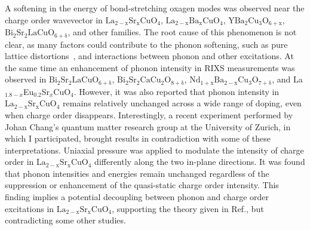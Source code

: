 \documentclass[11pt]{article}
\begin{document}
%
A softening in the energy of bond-stretching oxagen modes was observed near the charge order wavevector in $\mathrm{La_{2-x}Sr_{x}CuO_{4}}$\cite{lin_strongly_2020, wang_charge_2021, huang_quantum_2021}, $\mathrm{La_{2-x}Ba_{x}CuO_{4}}$\cite{miao_incommensurate_2018}, $\mathrm{YBa_{2}Cu_{3}O_{6+x}}$\cite{tacon_inelastic_2014}, $\mathrm{Bi_{2}Sr_{2}LaCuO_{6+\delta}}$\cite{li_multiorbital_2020}, and other families. 
The root cause of this phenomenon is not clear, as many factors could contribute to the phonon softening, such as pure lattice distortions~\cite{lin_strongly_2020}, and interactions between phonon and other excitations.  
At the same time an enhancement of phonon intensity in RIXS measurements was observed in $\mathrm{Bi_{2}Sr_{2}LaCuO_{6+\delta}}$\cite{li_multiorbital_2020}, $\mathrm{Bi_{2}Sr_{2}CaCu_{2}O_{8+\delta}}$\cite{chaix_dispersive_2017}, $\mathrm{Nd_{1+x}Ba_{2-x}Cu_{3}O_{7+\delta}}$\cite{braicovich_determining_2020}, and {La$_{1.8-x}$Eu$_{0.2}$Sr$_x$CuO$_{4}$}\cite{peng_enhanced_2020,wang_charge_2021,huang_quantum_2021}. 
However, it was also reported that phonon intensity in $\mathrm{La_{2-x}Sr_{x}CuO_{4}}$ remains relatively unchanged across a wide range of doping, even when charge order disappears\cite{lin_strongly_2020}.  
Interestingly, a recent experiment performed by Johan Chang's quantum matter research group at the University of Zurich, in which I participated, brought results in contradiction with some of these interpretations. 
Uniaxial pressure was applied to modulate the intensity of charge order in $\mathrm{La_{2-x}Sr_{x}CuO_{4}}$ differently along the two in-plane directions. 
It was found that phonon intensities and energies remain unchanged regardless of the suppression or enhancement of the quasi-static charge order intensity. 
This finding implies a potential decoupling between phonon and charge order excitations in $\mathrm{La_{2-x}Sr_{x}CuO_{4}}$, supporting the theory given in Ref.\cite{lin_strongly_2020}, but contradicting some other studies\cite{li_multiorbital_2020, chaix_dispersive_2017,huang_quantum_2021}. 
\end{document}
